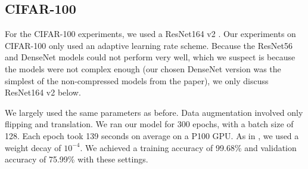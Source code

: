 \documentclass{article}
\begin{document}
\subsection{CIFAR-100}
For the CIFAR-100 experiments, we used a ResNet164 v2 \cite{he2016identity}. Our experiments on CIFAR-100 only used an adaptive learning rate scheme. Because the ResNet56 and DenseNet models could not perform very well, which we suspect is because the models were not complex enough (our chosen DenseNet version was the simplest of the non-compressed models from the paper\cite{huang2017densely}), we only discuss ResNet164 v2 below. 

We largely used the same parameters as before. Data augmentation involved only flipping and translation. We ran our model for 300 epochs, with a batch size of 128. Each epoch took 139 seconds on average on a P100 GPU. As in \cite{he2016identity}, we used a weight decay of $10^{-4}$. We achieved a training accuracy of 99.68\% and validation accuracy of 75.99\% with these settings.
\end{document}
